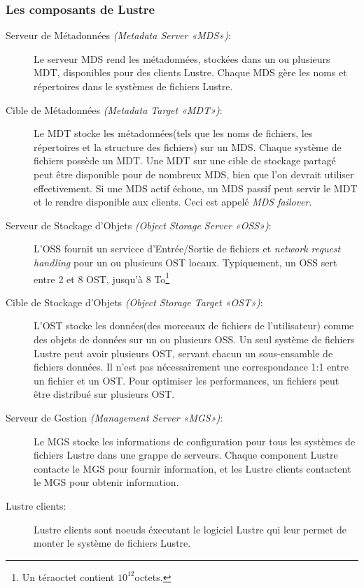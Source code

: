 \documentclass[12pt]{article}
\begin{document}
\subsubsection{Les composants de Lustre}
\begin{description}
\item[Serveur de Métadonnées \textit{(Metadata Server «MDS»)}:]
Le serveur MDS rend les métadonnées, stockées dans un ou plusieurs MDT, disponibles pour des clients Lustre. Chaque MDS gère les noms et répertoires dans le systèmes de fichiers Lustre.
\item[Cible de Métadonnées \textit{(Metadata Target «MDT»)}:] Le MDT stocke les métadonnées(tels que les noms de fichiers, les répertoires et la structure des fichiers) sur un MDS. Chaque système de fichiers possède un MDT. Une MDT sur une cible de stockage partagé peut être disponible pour de nombreux MDS, bien que l'on devrait utiliser effectivement. Si une MDS actif échoue, un MDS passif peut servir le MDT et le rendre disponible aux clients. Ceci est appelé \textit{MDS failover}.
\item[Serveur de Stockage d'Objets \textit{(Object Storage Server «OSS»)}:]
L'OSS fournit un servicce d'Entrée/Sortie de fichiers et \textit{network request handling} pour un ou plusieurs OST locaux. Typiquement, un OSS sert entre 2 et 8 OST, jusqu'à 8 To\footnote{Un téraoctet contient \begin{math}10^{12}\end{math}octets.}
\item[Cible de Stockage d'Objets \textit{(Object Storage Target «OST»)}:]
L'OST stocke les données(des morceaux de fichiers de l'utilisateur) comme des objets de données sur un ou plusieurs OSS. Un seul système de fichiers Lustre peut avoir plusieurs OST, servant chacun un sous-ensamble de fichiers données. Il n'est pas nécessairement une correspondance 1:1 entre un fichier et un OST. Pour optimiser les performances, un fichiers peut être distribué sur plusieurs OST.
\item[Serveur de Gestion \textit{(Management Server «MGS»)}:]
Le MGS stocke les informations de configuration pour tous les systèmes de fichiers Lustre dans une grappe de serveurs. Chaque component Lustre contacte le MGS pour fournir information, et les Lustre clients contactent le MGS pour obtenir information.
\item[Lustre clients:]Lustre clients sont noeuds éxecutant le logiciel Lustre qui leur permet de monter le système de fichiers Lustre.


\end{description}
\end{document}
